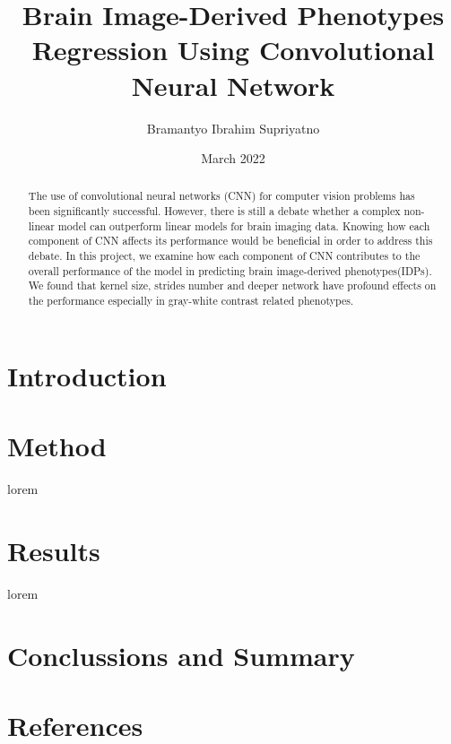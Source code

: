 \documentclass[english]{article}
\title{Brain Image-Derived Phenotypes Regression Using Convolutional Neural Network}
\author{Bramantyo Ibrahim Supriyatno}
\date{March 2022}
\begin{document}
    \maketitle
    \begin{abstract}
        The use of convolutional neural networks (CNN) for computer vision problems has been significantly successful. 
        However, there is still a debate whether a complex non-linear model can outperform linear models for brain imaging data. 
        Knowing how each component of CNN affects its performance would be beneficial in order to address this debate. 
        In this project, we examine how each component of CNN contributes to the overall performance of the model in predicting brain image-derived phenotypes(IDPs). 
        We found that kernel size, strides number and deeper network have profound effects on the performance especially in gray-white contrast related phenotypes. 
    \end{abstract}
    

    \section*{Introduction}
    
    \section*{Method}
    lorem

    \section*{Results}
    lorem
    \section*{Conclussions and Summary}

    \section*{References}

    \printbibliography
\end{document}
